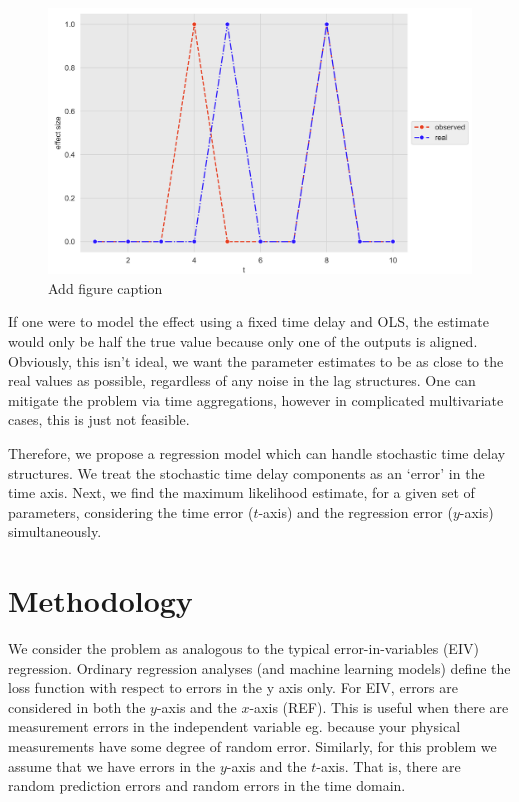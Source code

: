 \documentclass[11pt]{amsart}
\begin{document}
\begin{center}
\begin{figure}
\includegraphics[totalheight=6cm]{images/2_input_delay_example.png}
\caption{Add figure caption}
\label{fig:verticalcell}
\end{figure}
\end{center}

If one were to model the effect using a fixed time delay and OLS, the estimate would only be half the true value because only one of the outputs is aligned. Obviously, this isn't ideal, we want the parameter estimates to be as close to the real values as possible, regardless of any noise in the lag structures. One can mitigate the problem via time aggregations, however in complicated multivariate cases, this is just not feasible.

Therefore, we propose a regression model which can handle stochastic time delay structures. We treat the stochastic time delay components as an ‘error’ in the time axis. Next, we find the maximum likelihood estimate, for a given set of parameters, considering the time error ($t$-axis) and the regression error ($y$-axis) simultaneously.


\section{Methodology}

We consider the problem as analogous to the typical error-in-variables (EIV) regression. Ordinary regression analyses (and machine learning models) define the loss function with respect to errors in the y axis only. For EIV, errors are considered in both the $y$-axis and the $x$-axis (REF). This is useful when there are measurement errors in the independent variable eg. because your physical measurements have some degree of random error. Similarly, for this problem we assume that we have errors in the $y$-axis and the $t$-axis. That is, there are random prediction errors and random errors in the time domain. 
\end{document}
